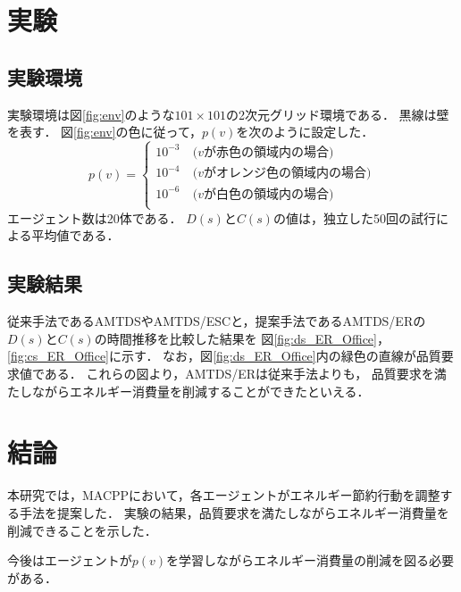 \documentclass[11pt,a4j,twocolumn]{jarticle}
\begin{document}
\section{実験}
\subsection{実験環境}
  実験環境は図\ref{fig:env}のような$101 \times 101$の2次元グリッド環境である．
  黒線は壁を表す．
  図\ref{fig:env}の色に従って，$p(v)$を次のように設定した．
  \[
    p(v) = 
    \begin{cases}
      10^{-3}\ & \textrm{($v$が赤色の領域内の場合)}\\
      10^{-4}\ & \textrm{($v$がオレンジ色の領域内の場合)}\\
      10^{-6}\ & \textrm{($v$が白色の領域内の場合)}\\
    \end{cases}
  \]
  エージェント数は20体である．
  $D(s)$と$C(s)$の値は，独立した50回の試行による平均値である．

  \subsection{実験結果}
  従来手法であるAMTDSやAMTDS/ESCと，提案手法であるAMTDS/ERの$D(s)$と$C(s)$の時間推移を比較した結果を
  図\ref{fig:ds_ER_Office}，\ref{fig:cs_ER_Office}に示す．
  なお，図\ref{fig:ds_ER_Office}内の緑色の直線が品質要求値である．
  これらの図より，AMTDS/ERは従来手法よりも，
  品質要求を満たしながらエネルギー消費量を削減することができたといえる．

\section{結論}
本研究では，MACPPにおいて，各エージェントがエネルギー節約行動を調整する手法を提案した．
実験の結果，品質要求を満たしながらエネルギー消費量を削減できることを示した．
\par

今後はエージェントが$p(v)$を学習しながらエネルギー消費量の削減を図る必要がある．



\end{document}
